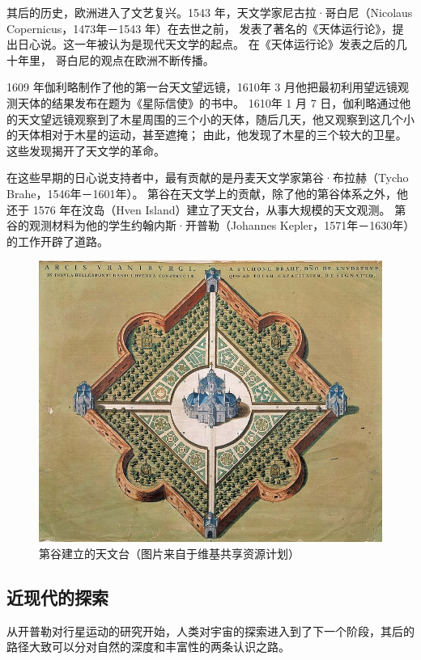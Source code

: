 \documentclass[a4paper,10.5pt]{book}
\begin{document}
其后的历史，欧洲进入了文艺复兴。1543 年，天文学家尼古拉·哥白尼（Nicolaus Copernicus，1473年－1543 年）在去世之前，
发表了著名的《天体运行论》，提出日心说。这一年被认为是现代天文学的起点。 在《天体运行论》发表之后的几十年里，
哥白尼的观点在欧洲不断传播。

1609 年伽利略制作了他的第一台天文望远镜，1610年 3 月他把最初利用望远镜观测天体的结果发布在题为《星际信使》的书中。
1610年 1 月 7 日，伽利略通过他的天文望远镜观察到了木星周围的三个小的天体，随后几天，他又观察到这几个小的天体相对于木星的运动，甚至遮掩；
由此，他发现了木星的三个较大的卫星。这些发现揭开了天文学的革命。

在这些早期的日心说支持者中，最有贡献的是丹麦天文学家第谷·布拉赫（Tycho Brahe，1546年－1601年）。
第谷在天文学上的贡献，除了他的第谷体系之外，他还于 1576 年在汶岛（Hven Island）建立了天文台，从事大规模的天文观测。
第谷的观测材料为他的学生约翰内斯·开普勒（Johannes Kepler，1571年－1630年）的工作开辟了道路。

\begin{figure}[ht]
\centering
\includegraphics[width=5.0in]{images/1_09-Uraniborgskiss.jpg}
\caption{第谷建立的天文台（图片来自于维基共享资源计划）}
\end{figure}

\subsection{近现代的探索}

从开普勒对行星运动的研究开始，人类对宇宙的探索进入到了下一个阶段，其后的路径大致可以分对自然的深度和丰富性的两条认识之路。
\end{document}
